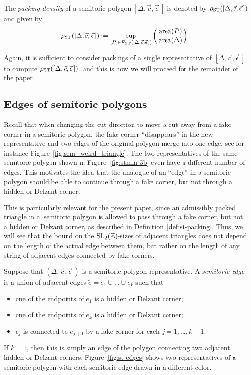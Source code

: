 \documentclass[pdftex]{sigma}
\numberwithin{equation}{section}
\def\Z{{\mathbb Z}}
\newcommand{\De}{\Delta}
\newcommand{\area}{\operatorname{area}}
\newcommand{\PST}{\mathcal{P}_{\rm ST}}
\newcommand{\SL}{{\rm SL}_2(\Z)}
\newcommand{\stpoly}{[\De,\vec{c},\vec{\epsilon}\,]}
\newcommand{\strep}{(\De,\vec{c},\vec{\epsilon}\,)}
\begin{document}
\begin{Definition}\label{def:semitoric-density}
The \emph{packing density} of a semitoric polygon $\stpoly$ is denoted by $\rho_{{\rm ST}}(\stpoly)$ and given by
\[
 \rho_{{\rm ST}}(\stpoly): = \sup_{[P] \in \PST(\stpoly)}\left( \frac{\area(P)}{\area(\De)}\right).
\]
\end{Definition}


Again, it is sufficient to consider packings of a single representative of $\stpoly$ to compute $\rho_{{\rm ST}}(\stpoly)$, and this is how we will proceed for the remainder of the paper.






\subsection{Edges of semitoric polygons}
\label{sec:semitoric-edge}
Recall that when changing the cut direction to move a cut away from a fake corner in a semitoric polygon, the fake corner ``disappears'' in the new representative and two edges of the original polygon merge into one edge, see for instance Figure~\ref{fig:sem_weird_triangle}.
The two representatives of the same semitoric polygon shown in Figure~\ref{fig:stmin-3b} even have a different number of edges.
This motivates the idea that the analogue of an ``edge'' in a semitoric polygon should be able to continue through a fake corner, but not through a hidden or Delzant corner.


This is particularly relevant for the present paper, since an admissibly packed triangle in a~semitoric polygon is allowed to pass through a fake corner, but not a hidden or Delzant corner, as described in Definition~\ref{def:st-packing}.
Thus, we will see that the bound on the $\SL$-sizes of adjacent triangles does not depend on the length of the actual edge between them, but rather on the length of any string of adjacent edges connected by fake corners.

\begin{Definition}\label{def:st-edge}
Suppose that $\strep$ is a semitoric polygon representative.
A \emph{semitoric edge} is a union of adjacent edges $\tilde{e} = e_1\cup \dots \cup e_k$ such that
\begin{itemize}\itemsep=0pt
 \item one of the endpoints of $e_1$ is a hidden or Delzant corner;
 \item one of the endpoints of $e_k$ is a hidden or Delzant corner;
 \item $e_j$ is connected to $e_{j+1}$ by a fake corner for each $j=1,\ldots, k-1$.
\end{itemize}
\end{Definition}
If $k=1$, then this is simply an edge of the polygon connecting two adjacent hidden or Delzant corners.
Figure~\ref{fig:st-edges} shows two representatives of a semitoric polygon with each semitoric edge drawn in a different color.
\end{document}
